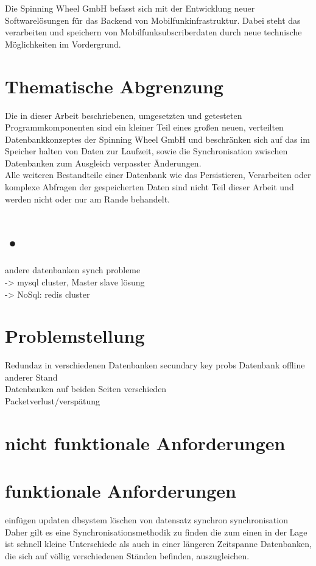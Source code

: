\documentclass[a4paper,11pt,oneside,%
headsepline,												%
footsepline,												%
bibtotocnumbered									%
]{scrreprt}
\begin{document}
Die Spinning Wheel GmbH befasst sich mit der Entwicklung neuer Softwarelösungen für das Backend von Mobilfunkinfrastruktur. Dabei steht das verarbeiten und speichern von Mobilfunksubscriberdaten durch neue technische Möglichkeiten im Vordergrund.

\section{Thematische Abgrenzung}
Die in dieser Arbeit beschriebenen, umgesetzten und getesteten Programmkomponenten sind ein kleiner Teil eines großen neuen, verteilten Datenbankkonzeptes der Spinning Wheel GmbH und beschränken sich auf das im Speicher halten von Daten zur Laufzeit, sowie die Synchronisation zwischen Datenbanken zum Ausgleich verpasster Änderungen.\\

Alle weiteren Bestandteile einer Datenbank wie das Persistieren, Verarbeiten oder komplexe Abfragen der gespeicherten Daten sind nicht Teil dieser Arbeit und werden nicht oder nur am Rande behandelt.  

\section{•}
andere datenbanken synch probleme\\
-> mysql cluster, Master slave lösung\\
-> NoSql: redis cluster\\



\section{Problemstellung}
Redundaz in verschiedenen Datenbanken
secundary key probs
Datenbank offline anderer Stand \\
Datenbanken auf beiden Seiten verschieden\\
Packetverlust/verspätung



\section{nicht funktionale Anforderungen}

\section{funktionale Anforderungen}
einfügen
updaten
dbsystem löschen von datensatz synchron
synchronisation
Daher gilt es eine Synchronisationsmethodik zu finden die zum einen in der Lage ist schnell kleine Unterschiede als auch in einer längeren Zeitspanne Datenbanken, die sich auf völlig verschiedenen Ständen befinden, auszugleichen.
\end{document}

